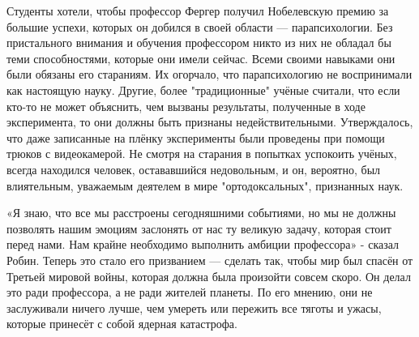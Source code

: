 \documentclass[a4paper,12pt]{book}
\begin{document}
	Студенты хотели, чтобы профессор Фергер получил Нобелевскую премию за большие успехи, которых он добился в своей области — парапсихологии. Без пристального внимания и обучения профессором никто из них не обладал бы теми способностями, которые они имели сейчас. Всеми своими навыками они были обязаны его стараниям.
	Их огорчало, что парапсихологию не воспринимали как настоящую науку. Другие, более "традиционные" учёные считали, что если кто-то не может объяснить, чем вызваны результаты, полученные в ходе эксперимента, то они должны быть признаны недействительными. Утверждалось, что даже записанные на плёнку эксперименты были проведены при помощи трюков с видеокамерой. Не смотря на старания в попытках успокоить учёных, всегда находился человек, остававшийся недовольным, и он, вероятно, был влиятельным, уважаемым деятелем в мире "ортодоксальных", признанных наук.

	«Я знаю, что все мы расстроены сегодняшними событиями, но мы не должны позволять нашим эмоциям заслонять от нас ту великую задачу, которая стоит перед нами. Нам крайне необходимо выполнить амбиции профессора» - сказал Робин.
	Теперь это стало его призванием — сделать так, чтобы мир был спасён от Третьей мировой войны, которая должна была произойти совсем скоро. Он делал это ради профессора, а не ради жителей планеты. По его мнению, они не заслуживали ничего лучше, чем умереть или пережить все тяготы и ужасы, которые принесёт с собой ядерная катастрофа.
\end{document}
